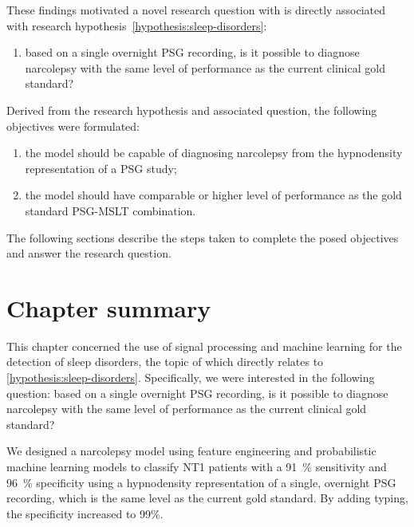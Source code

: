 These findings motivated a novel research question with is directly associated with research hypothesis~\ref{hypothesis:sleep-disorders}\graffito{\ref{hypothesis:sleep-disorders}: \hypothesis\xspace sleep disorders.}: 
\newcommand{\questionSleepDisorders}{based on a single overnight \ac{PSG} recording, is it possible to diagnose narcolepsy with the same level of performance as the current clinical gold standard?}
\begin{enumerate}[label={\footnotesize\bfseries\scshape RQ~3.\arabic*}, ref={\bfseries\scshape RQ~3.\arabic*}]
    \item \questionSleepDisorders\label{question:sleep-disorders}
\end{enumerate}

Derived from the research hypothesis and associated question, the following objectives were formulated:

\begin{enumerate}[label=(\roman*)]
    \item the model should be capable of diagnosing narcolepsy from the hypnodensity representation of a \ac{PSG} study;
    \item the model should have comparable or higher level of performance as the gold standard \ac{PSG}-\ac{MSLT} combination.
\end{enumerate}

The following sections describe the steps taken to complete the posed objectives and answer the research question.

\cleardoublepage

\clearpage\section{Chapter summary}

This chapter%
\graffito{\ref{hypothesis:sleep-disorders}: \hypothesis\xspace sleep disorders} %
concerned the use of signal processing and machine learning for the detection of sleep disorders, the topic of which directly relates to \ref{hypothesis:sleep-disorders}.
Specifically, we were interested in the following question: \questionSleepDisorders\xspace 

We designed a narcolepsy model using feature engineering and probabilistic machine learning models to classify \ac{NT1} patients with a \SI{91}{\percent} sensitivity and \SI{96}{\percent} specificity using a hypnodensity representation of a single, overnight \ac{PSG} recording, which is the same level as the current gold standard. 
By adding \hla typing, the specificity increased to 99\%.